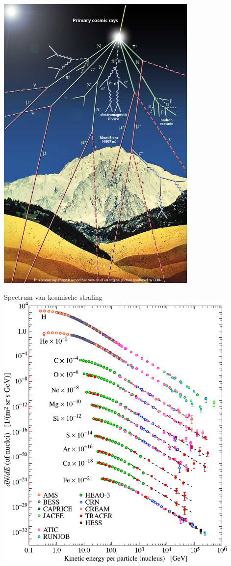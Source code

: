\Tr
\twocolumn
\begin{center}
\includegraphics[keepaspectratio,height=15cm]{cosray}
\end{center}

\newpage

\begin{center}
{\blue Spectrum van kosmische straling}\\[5mm]
\includegraphics[keepaspectratio,height=14cm]{cr-low-e}
\end{center}

